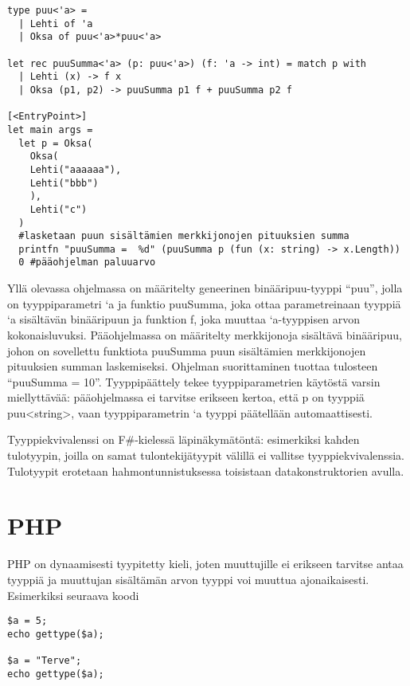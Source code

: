 \begin{lstlisting}
type puu<'a> =
  | Lehti of 'a
  | Oksa of puu<'a>*puu<'a>

let rec puuSumma<'a> (p: puu<'a>) (f: 'a -> int) = match p with
  | Lehti (x) -> f x
  | Oksa (p1, p2) -> puuSumma p1 f + puuSumma p2 f

[<EntryPoint>]
let main args =
  let p = Oksa(
	Oksa(
  	Lehti("aaaaaa"),
  	Lehti("bbb")
	),
	Lehti("c")
  )
  #lasketaan puun sisältämien merkkijonojen pituuksien summa
  printfn "puuSumma =  %d" (puuSumma p (fun (x: string) -> x.Length))
  0 #pääohjelman paluuarvo
\end{lstlisting}

Yllä olevassa ohjelmassa on määritelty geneerinen binääripuu-tyyppi “puu”, jolla on tyyppiparametri ‘a ja funktio puuSumma, joka ottaa parametreinaan tyyppiä ‘a sisältävän binääripuun ja funktion f, joka muuttaa ‘a-tyyppisen arvon kokonaisluvuksi. Pääohjelmassa on määritelty merkkijonoja sisältävä binääripuu, johon on sovellettu funktiota puuSumma puun sisältämien merkkijonojen pituuksien summan laskemiseksi. Ohjelman suorittaminen tuottaa tulosteen “puuSumma =  10”. Tyyppipäättely tekee tyyppiparametrien käytöstä varsin miellyttävää: pääohjelmassa ei tarvitse erikseen kertoa, että p on tyyppiä puu<string>, vaan tyyppiparametrin ‘a tyyppi päätellään automaattisesti. 
\par
Tyyppiekvivalenssi on F\#-kielessä läpinäkymätöntä: esimerkiksi kahden tulotyypin, joilla on samat tulontekijätyypit välillä ei vallitse tyyppiekvivalenssia. Tulotyypit erotetaan hahmontunnistuksessa toisistaan datakonstruktorien avulla.


\section{PHP}

\lstset{language=PHP,
	basicstyle=\ttfamily,
	breaklines=true,
	columns=fullflexible}

PHP on dynaamisesti tyypitetty kieli, joten muuttujille ei erikseen tarvitse antaa tyyppiä ja muuttujan sisältämän arvon tyyppi voi muuttua ajonaikaisesti. Esimerkiksi seuraava koodi~\cite{man_php_types}

\begin{lstlisting}
$a = 5;
echo gettype($a);

$a = "Terve";
echo gettype($a);
\end{lstlisting}

